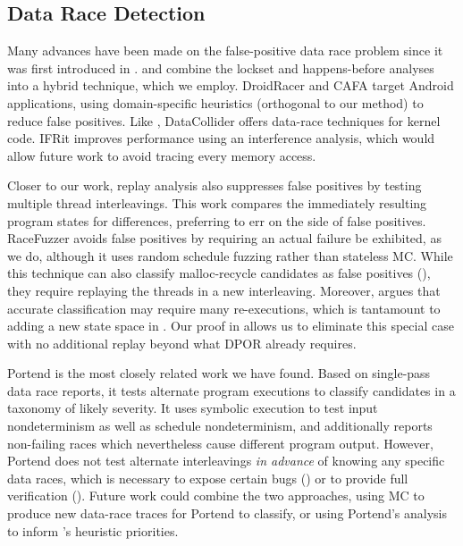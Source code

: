 \subsection{Data Race Detection}
\label{sec:related-dr}

Many advances have been made on the false-positive data race problem since it was first introduced in \cite{eraser}.
\cite{hybriddatarace} and \cite{tsan} combine the lockset and happens-before analyses into a hybrid technique, which we employ.
DroidRacer \cite{droidracer} and CAFA \cite{cafa} target
Android applications, using domain-specific heuristics (orthogonal to our method) to reduce false positives. %
Like \landslide, DataCollider \cite{datacollider} offers data-race techniques for kernel code.
IFRit \cite{ifrit}
improves performance using an interference analysis,
which would allow future work to avoid tracing every memory access.

Closer to our work, replay analysis \cite{recordreplaydrs} also suppresses false positives by testing multiple thread interleavings.
This work compares the immediately resulting program states for differences,
preferring to err on the side of false positives.
RaceFuzzer \cite{racefuzzer} avoids false positives by requiring an actual failure be exhibited, as we do,
although it uses random schedule fuzzing rather than stateless MC.
While this technique can also classify malloc-recycle candidates as false positives (\sect{\ref{sec:recycle}}),
they require replaying the threads in a new interleaving.
Moreover, \cite{portend} argues that accurate classification may require many re-executions,
which is tantamount to adding a new state space in \quicksand.
Our proof in \sect{\ref{sec:recycle}} allows us to eliminate this special case with no additional replay beyond what DPOR already requires.

Portend \cite{portend} is the most closely related work we have found.
Based on single-pass data race reports, it tests alternate program executions to classify candidates in a taxonomy of likely severity.
It uses symbolic execution to test input nondeterminism as well as schedule nondeterminism,
and additionally reports non-failing races which nevertheless cause
different program output. %
However, Portend does not test alternate interleavings {\em in advance} of knowing any specific data races,
which is necessary to expose certain bugs (\sect{\ref{sec:eval-falseneg}}) or to provide full verification (\sect{\ref{sec:totalverif}}).
Future work could combine the two approaches, using MC to produce new data-race traces for Portend to classify, or using Portend's analysis to inform \quicksand's heuristic priorities.

